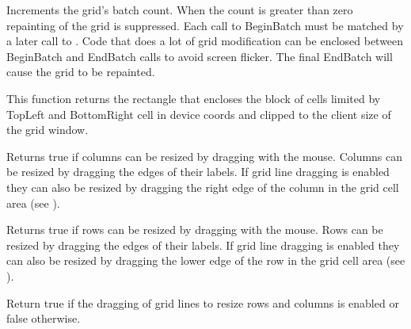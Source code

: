 \label{wxgridbeginbatch}


Increments the grid's batch count. When the count is greater than zero repainting of
the grid is suppressed. Each call to BeginBatch must be matched by a later call to
. Code that does a lot of grid
modification can be enclosed between BeginBatch and EndBatch calls to avoid
screen flicker. The final EndBatch will cause the grid to be repainted.



\label{wxgridblocktodevicerect}


This function returns the rectangle that encloses the block of cells
limited by TopLeft and BottomRight cell in device coords and clipped
to the client size of the grid window.



\label{wxgridcandragcolsize}


Returns true if columns can be resized by dragging with the mouse. Columns can be resized
by dragging the edges of their labels. If grid line dragging is enabled they can also be
resized by dragging the right edge of the column in the grid cell area
(see ).



\label{wxgridcandragrowsize}


Returns true if rows can be resized by dragging with the mouse. Rows can be resized
by dragging the edges of their labels. If grid line dragging is enabled they can also be
resized by dragging the lower edge of the row in the grid cell area
(see ).



\label{wxgridcandraggridsize}


Return true if the dragging of grid lines to resize rows and columns is enabled or false otherwise.



